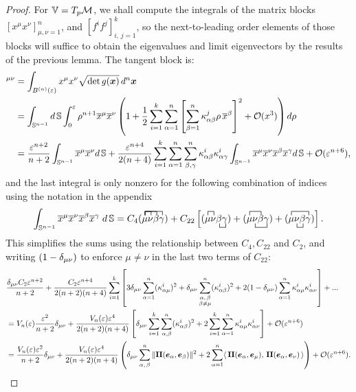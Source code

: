 \documentclass[letterpaper, reqno, 11pt]{amsart}
\theoremstyle{definition}
\theoremstyle{remark}
\numberwithin{equation}{section}
\begin{document}
\begin{proof}
For $\mathbb{V}=T_p{\mathcal M}$, we shall compute the integrals of the matrix blocks $[x^\mu x^\nu]_{\mu,\nu=1}^n$, and $[f^if^j]_{i,\, j=1}^k$, so the next-to-leading order elements of those blocks will suffice to obtain the eigenvalues and limit eigenvectors by the results of the previous lemma. The tangent block is:
\begin{align*}
[C(\Cyll(\vep))]^{\mu\nu} & = \int_{B^{(n)}(\vep)}x^\mu x^\nu\sqrt{\det g(\bx)}\, d^n\bx \\ 
& = \int_{\SS^{n-1}}d\,\SS\int^\vep_0\rho^{n+1}\cx^\mu\cx^\nu\left( 1+\frac{1}{2}\sum^k_{i=1}\sum^n_{\al=1}\left[\sum^n_{\bet=1}\ka^j_{\al\bet}\rho\,\cx^\bet \right]^2 +\cO(x^3) \right)d\rho \\
& = \frac{\vep^{n+2}}{n+2}\int_{\SS^{n-1}}\cx^\mu\cx^\nu d\,\SS +\frac{\vep^{n+4}}{2(n+4)}\sum_{i=1}^k\sum_{\al=1}^n\sum_{\bet,\ga}^n\ka^i_{\al\bet}\ka^i_{\al\ga}\int_{\SS^{n-1}}\cx^\mu\cx^\nu\cx^\bet\cx^\ga d\,\SS  +\cO(\vep^{n+6}),
\end{align*}
and the last integral is only nonzero for the following combination of indices using the notation in the appendix
\begin{equation}\label{eq:contr4}
\int_{\SS^{n-1}}\cx^\mu\cx^\nu\cx^\bet\cx^\ga \; d\,\SS = 
C_4\contraction{(}{\mu}{}{\nu}\contraction{(}{\mu}{\nu}{\bet}\contraction{(}{\mu}{\nu\bet}{\ga}(\mu\nu\bet\ga) +
C_{22}\left[
\contraction{(}{\mu}{}{\nu}\bcontraction{(\mu\mu}{\bet}{}{\ga}(\mu\nu\bet\ga) + 
\contraction{(}{\mu}{\nu}{\ga}\bcontraction{(\mu}{\nu}{\bet}{\ga}(\mu\nu\bet\ga) + 
\contraction{(}{\mu}{\nu\bet}{\ga}\bcontraction{(\mu}{\nu}{}{\bet}(\mu\nu\bet\ga)
\right].
\end{equation}
This simplifies the sums using the relationship between $C_4, C_{22}$ and $C_2$, and writing $(1-\delta_{\mu\nu})$ to enforce $\mu\neq\nu$ in the last two terms of $C_{22}$:
\begin{align*}
& \frac{\del_{\mu\nu} C_2\vep^{n+2}}{n+2}+ \frac{C_2\vep^{n+4}}{2(n+2)(n+4)}\sum_{i=1}^k\left[ 3\del_{\mu\nu}\sum_{\al=1}^n (\ka^i_{\al\mu})^2 + \del_{\mu\nu}\sum_{\substack{\al,\,\bet \\ \bet\neq \mu}}^n (\ka^i_{\al\bet})^2 + 2(1-\del_{\mu\nu})\sum_{\al=1}^n\ka^i_{\al\mu}\ka^i_{\al\nu} \right]+... \\
& = V_n(\vep)\frac{\vep^2}{n+2}\del_{\mu\nu}+ \frac{V_n(\vep)\vep^4}{2(n+2)(n+4)}\left[ \del_{\mu\nu}\sum_{i=1}^k\sum_{\al,\bet}^n(\ka^i_{\al\bet})^2 +2\sum_{i=1}^k\sum_{\al=1}^n\ka^i_{\al\mu}\ka^i_{\al\nu} \right]+\cO(\vep^{n+6}) \\
& = \frac{V_n(\vep)\vep^2}{n+2}\del_{\mu\nu}+ \frac{V_n(\vep)\vep^4}{2(n+2)(n+4)}\left( \del_{\mu\nu}\sum_{\al,\,\bet}^n\|\II(\bE_\al,\bE_\bet)\|^2 +2\sum_{\al=1}^n\metric{\II(\bE_\al,\bE_\mu)}{\II(\bE_\al,\bE_\nu)} \right)+\cO(\vep^{n+6}).

\end{align*}
\end{proof}
\end{document}
